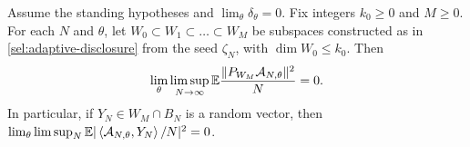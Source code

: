 \begin{proposition}
\label{sel:adaptive-orthogonality}
Assume the standing hypotheses and $\lim_\theta\delta_\theta=0$. Fix integers
$k_0\ge0$ and $M\ge0$. For each $N$ and $\theta$, let
$W_0\subset W_1\subset\dots\subset W_M$ be subspaces constructed as in
\cref{sel:adaptive-disclosure} from the seed $\zeta_N$, with
$\dim W_0\le k_0$. Then
\begin{equation}\label{sel:finite-span-orthogonality}
 \lim_\theta\limsup_{N\to\infty}
 \mathbb E\frac{\lVert P_{W_M}\mathcal A_{N,\theta}\rVert^2}N=0.
\end{equation}
In particular, if $Y_N\in W_M\cap B_N$ is a random vector, then
$\lim_\theta\limsup_N\mathbb E|\left\langle\mathcal A_{N,\theta},Y_N\right\rangle/N|^2=0$.
\end{proposition}

